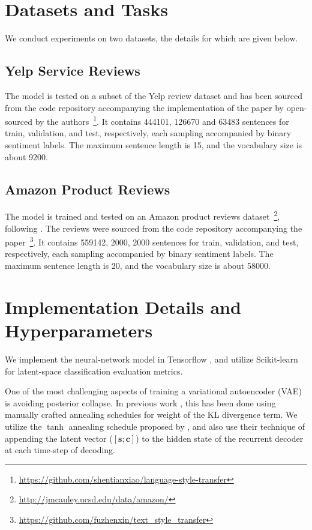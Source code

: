 \section{Datasets and Tasks} \label{sec:datasets-tasks}

We conduct experiments on two datasets, the details for which are given below.

\subsection{Yelp Service Reviews}

The model is tested on a subset of the Yelp review dataset \citep{challenge2013yelp} and has been sourced from the code repository accompanying the implementation of the paper by \cite{shen2017style} open-sourced by the authors~\footnote{\url{https://github.com/shentianxiao/language-style-transfer}}. It contains 444101, 126670 and 63483 sentences for train, validation, and test, respectively, each sampling accompanied by binary sentiment labels. The maximum sentence length is 15, and the vocabulary size is about 9200.

\subsection{Amazon Product Reviews}

The model is trained and tested on an Amazon product reviews dataset~\footnote{\url{http://jmcauley.ucsd.edu/data/amazon/}}, following \cite{fu2017style}. The reviews were sourced from the code repository accompanying the paper~\footnote{\url{https://github.com/fuzhenxin/text_style_transfer}}. It contains 559142, 2000, 2000 sentences for train, validation, and test, respectively, each sampling accompanied by binary sentiment labels. The maximum sentence length is 20, and the vocabulary size is about 58000.


\section{Implementation Details and Hyperparameters}

We implement the neural-network model in Tensorflow \citep{abadi2016tensorflow}, and utilize Scikit-learn \cite{pedregosa2011scikit} for latent-space classification evaluation metrics.

One of the most challenging aspects of training a variational autoencoder (VAE) is avoiding posterior collapse. In previous work \citep{yang2017improved, bowman2016generating, bahuleyan2017variational}, this has been done using manually crafted annealing schedules for weight of the KL divergence term. We utilize the $\tanh$ annealing schedule proposed by \cite{bahuleyan2017variational}, and also use their technique of appending the latent vector ($[\bm s; \bm c]$) to the hidden state of the recurrent decoder at each time-step of decoding.

